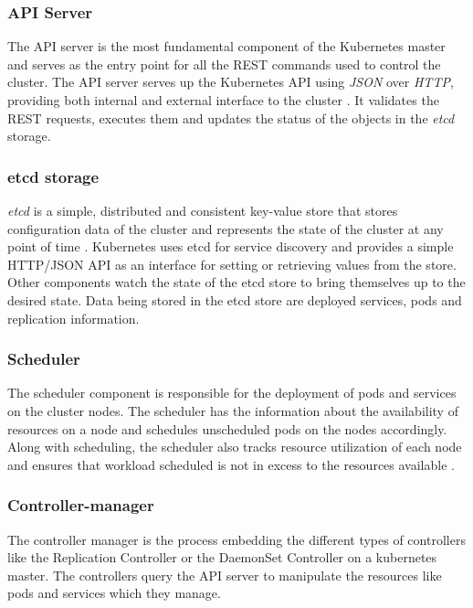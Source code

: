 \documentclass[9pt,twocolumn,twoside]{../../styles/osajnl}
\begin{document}
\subsubsection{API Server}
The API server is the most fundamental component of the Kubernetes
master and serves as the entry point for all the REST commands used to
control the cluster. The API server serves up the Kubernetes API using
\emph{JSON} over \emph{HTTP}, providing both internal and external
interface to the cluster \cite{www-kubernetes-digitalocean}
\cite{www-apiserver-kmblog}. It validates the REST requests, executes
them and updates the status of the objects in the \emph{etcd} storage.

\subsubsection{etcd storage}
\emph{etcd} is a simple, distributed and consistent key-value store
that stores configuration data of the cluster and represents the state
of the cluster at any point of time
\cite{www-wiki-kubernetes}. Kubernetes uses etcd for service discovery
and provides a simple HTTP/JSON API as an interface for setting or
retrieving values from the store. Other components watch the state of
the etcd store to bring themselves up to the desired state. Data being
stored in the etcd store are deployed services, pods and replication
information.

\subsubsection{Scheduler}
The scheduler component is responsible for the deployment of pods and
services on the cluster nodes. The scheduler has the information about
the availability of resources on a node and schedules unscheduled pods
on the nodes accordingly. Along with scheduling, the scheduler also
tracks resource utilization of each node and ensures that workload
scheduled is not in excess to the resources available
\cite{www-wiki-kubernetes}.

\subsubsection{Controller-manager}
The controller manager is the process embedding the different types of
controllers like the Replication Controller or the DaemonSet
Controller on a kubernetes master. The controllers query the API
server to manipulate the resources like pods and services  which they
manage.
\end{document}
